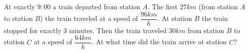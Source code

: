 At exactly $9{:}00$ a train departed from station $A$. The first $27km$ (from station $A$ to station $B$) the train traveled at a speed of $\dfrac{96 k m}{h}$. At station $B$ the train stopped for exactly $3$ minutes. Then the train traveled $30km$ from station $B$ to station $C$ at a speed of $\dfrac{64 k m}{h}$. At what time did the train arrive at station $C$?
